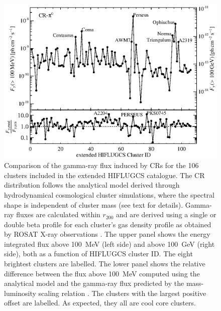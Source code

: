 \documentclass[10pt,aps,pra,reprint,amsmath,amsfonts,amssymb,showpacs,nofootinbib,floatfix]{revtex4-1}
\newcommand{\rvir}{r_{200}}
\begin{document}
{\begin{figure}%
\begin{minipage}{2.0\columnwidth}
 \includegraphics[width=0.99\columnwidth]{figures/Flux.comp.CR.eps}
 \caption{Comparison of the gamma-ray flux induced by CRs for the
   106 clusters included in the extended HIFLUGCS catalogue. The CR
   distribution follows the analytical model derived through
   hydrodynamical cosmological cluster simulations, where the spectral
   shape is independent of cluster mass \protect
   \cite{2010MNRAS.409..449P} (see text for details). Gamma-ray fluxes
   are calculated within $\rvir$ and are derived using a single or
   double beta profile for each cluster's gas density profile as
   obtained by ROSAT X-ray observations
   \cite{2007A&A...466..805C}. The upper panel shows the energy
   integrated flux above 100~MeV (left side) and above 100~GeV (right
   side), both as a function of HIFLUGCS cluster ID. The eight
   brightest clusters are labelled. The lower panel shows the relative
   difference between the flux above 100~MeV computed using the
   analytical model and the gamma-ray flux predicted by the
   mass-luminosity scaling relation \cite{2010MNRAS.409..449P}. The
   clusters with the largest positive offset are labelled. As
   expected, they all are cool core clusters.}
 \label{fig19}
\end{minipage}
\end{figure}


}
\end{document}
